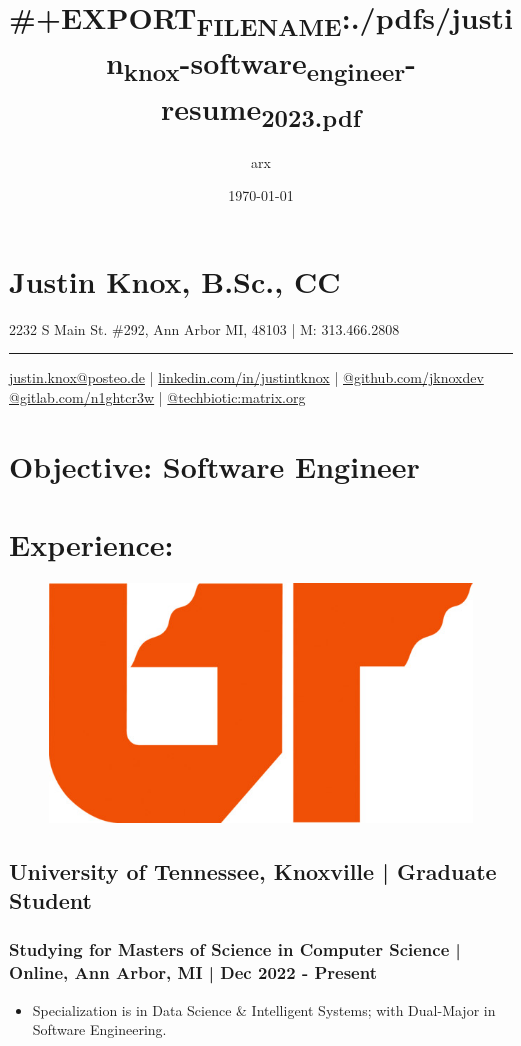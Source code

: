 \documentclass[letter,10pt]{article}
\author{arx}
\date{\today}
\title{\#+EXPORT\textsubscript{FILE}\textsubscript{NAME}:./pdfs/justin\textsubscript{knox}-software\textsubscript{engineer}-resume\textsubscript{2023.pdf}}
\begin{document}
\maketitle
\section*{Justin Knox, B.Sc., CC}
\label{sec:org923b3e4}
2232 S Main St. \#292, Ann Arbor MI, 48103 | M: 313.466.2808

\noindent\rule{\textwidth}{0.5pt}
\href{mailto:justin.knox@posteo.de}{justin.knox@posteo.de} | \href{https://www.linkedin.com/in/justintknox}{linkedin.com/in/justintknox} | \href{https://www.github.com/jknoxdev}{@github.com/jknoxdev} \\
\href{https://gitlab.com/n1ghtcr3w}{@gitlab.com/n1ghtcr3w} | \href{https://matrix.to/\#/@techbiotic:matrix.org}{@techbiotic:matrix.org}


\section*{Objective:              Software Engineer}
\label{sec:org67821ac}
\section*{Experience:}
\label{sec:org2b9492f}
\begin{figure}
\includegraphics[width=0.45\linewidth]{./img/50p_cr_utk.jpg}
\end{figure}

\subsection*{University of Tennessee, Knoxville | Graduate Student}
\label{sec:orgba9d676}
\subsubsection*{Studying for Masters of Science in Computer Science | Online, Ann Arbor, MI | Dec 2022 - Present}
\label{sec:orgdb0ea90}
\begin{itemize}
\item Specialization is in Data Science \& Intelligent Systems; with Dual-Major in Software Engineering.
\end{itemize}
\end{document}
